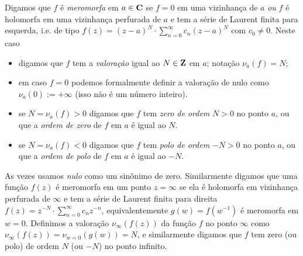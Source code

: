 \begin{defin}
Digamos que $f$ é \emph{meromorfa} em $a\in\mathbf{C}$ se $f=0$ em uma vizinhança de $a$
\emph{ou} $f$ é holomorfa em uma vizinhança perfurada de $a$ e tem a série de Laurent
finita para esquerda, i.e. de tipo
$f(z) = (z-a)^N \cdot \sum_{n=0}^\infty c_n (z-a)^N$
com $c_0\neq 0$.
Neste caso
\begin{itemize}
\item digamos que $f$ tem a \emph{valoração} igual ao $N\in\mathbf{Z}$ em $a$;
notação $\nu_a(f) = N$;
\item em caso $f=0$ podemos formalmente definir
a valoração de nulo como $\nu_a(0) := +\infty$ (isso não é um número inteiro).
\item se $N = \nu_a(f) > 0$ digamos que $f$ tem \emph{zero de ordem} $N>0$ no ponto $a$,
ou que a \emph{ordem de zero} de $f$ em $a$ é igual ao $N$.
\item se $N = \nu_a(f) < 0$ digamos que $f$ tem \emph{polo de ordem} $-N>0$ no ponto $a$,
ou que a \emph{ordem de polo} de $f$ em $a$ é igual ao $-N$.
\end{itemize}
As vezes usamos \emph{nulo} como um sinônimo de zero.
Similarmente digamos que uma função $f(z)$ é meromorfa em um ponto $z=\infty$ se ela é holomorfa
em vizinhança perfurada de $\infty$ e tem a série de Laurent finita para direita
$f(z) = z^{-N} \cdot \sum_{n=0}^\infty c_n z^{-n}$,
equivalentemente $g(w) = f(w^{-1})$ é meromorfa em $w=0$.
Definimos a valoração $\nu_\infty(f(z))$ da função $f$ no ponto $\infty$ 
como $\nu_\infty(f(z)) = \nu_{w=0}(g(w)) = N$, e similarmente digamos
que $f$ tem zero (ou polo) de ordem $N$ (ou $-N$) no ponto infinito.
\end{defin}

